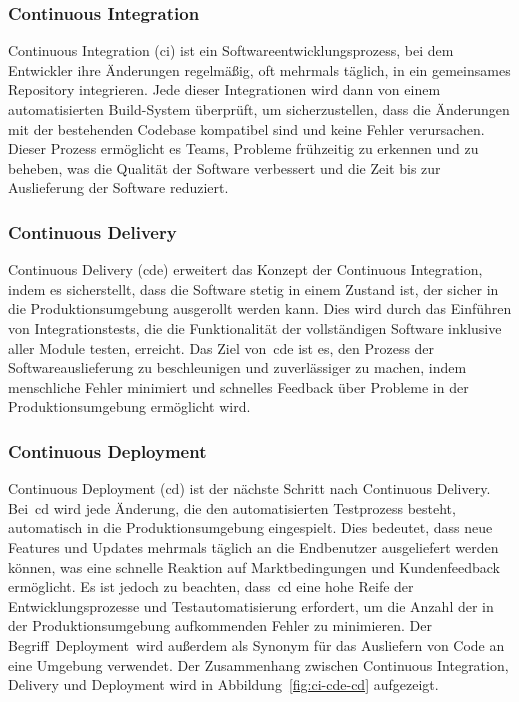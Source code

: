 \subsubsection{Continuous Integration}

Continuous Integration (\acrshort{ci}) ist ein Softwareentwicklungsprozess, bei dem Entwickler ihre Änderungen
regelmäßig, oft mehrmals täglich, in ein gemeinsames Repository integrieren.
Jede dieser Integrationen wird dann von einem automatisierten Build-System überprüft, um sicherzustellen, dass die
Änderungen mit der bestehenden Codebase kompatibel sind und keine Fehler verursachen.
Dieser Prozess ermöglicht es Teams, Probleme frühzeitig zu erkennen und zu beheben, was die Qualität der Software
verbessert und die Zeit bis zur Auslieferung der Software reduziert.

\subsubsection{Continuous Delivery}

Continuous Delivery (\acrshort{cde}) erweitert das Konzept der Continuous Integration, indem es sicherstellt, dass die
Software stetig in einem Zustand ist, der sicher in die Produktionsumgebung ausgerollt werden kann.
Dies wird durch das Einführen von Integrationstests, die die Funktionalität der vollständigen Software inklusive aller
Module testen, erreicht.
Das Ziel von\ \acrshort{cde} ist es, den Prozess der Softwareauslieferung zu beschleunigen und zuverlässiger zu machen,
indem menschliche Fehler minimiert und schnelles Feedback über Probleme in der Produktionsumgebung ermöglicht wird.

\subsubsection{Continuous Deployment}

Continuous Deployment (\acrshort{cd}) ist der nächste Schritt nach Continuous Delivery.
Bei\ \acrshort{cd} wird jede Änderung, die den automatisierten Testprozess besteht, automatisch in die
Produktionsumgebung eingespielt.
Dies bedeutet, dass neue Features und Updates mehrmals täglich an die Endbenutzer ausgeliefert werden können, was eine
schnelle Reaktion auf Marktbedingungen und Kundenfeedback ermöglicht.
Es ist jedoch zu beachten, dass\ \acrshort{cd} eine hohe Reife der Entwicklungsprozesse und Testautomatisierung
erfordert, um die Anzahl der in der Produktionsumgebung aufkommenden Fehler zu minimieren.
Der Begriff\ \glqq Deployment\grqq\ wird außerdem als Synonym für das Ausliefern von Code an eine Umgebung verwendet.
Der Zusammenhang zwischen Continuous Integration, Delivery und Deployment wird in Abbildung\ \ref{fig:ci-cde-cd}
aufgezeigt.

